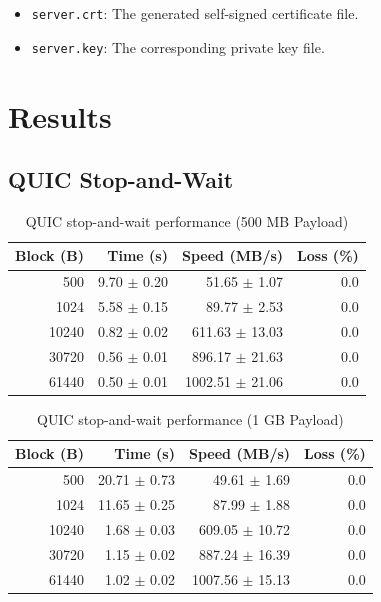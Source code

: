 \documentclass[12pt,a4paper]{article}
\begin{document}
\begin{itemize}
    \item \texttt{server.crt}: The generated self-signed certificate file.
    \item \texttt{server.key}: The corresponding private key file.
\end{itemize}

\section{Results}

\subsection{QUIC Stop-and-Wait}

\begin{table}[H]
    \centering
    \begin{tabular}{rrrr}
        \toprule
        \textbf{Block (B)} & \textbf{Time (s)} & \textbf{Speed (MB/s)} & \textbf{Loss (\%)} \\
        \midrule
        500 & 9.70 $\pm$ 0.20 & 51.65 $\pm$ 1.07 & 0.0 \\
        1024 & 5.58 $\pm$ 0.15 & 89.77 $\pm$ 2.53 & 0.0 \\
        10240 & 0.82 $\pm$ 0.02 & 611.63 $\pm$ 13.03 & 0.0 \\
        30720 & 0.56 $\pm$ 0.01 & 896.17 $\pm$ 21.63 & 0.0 \\
        61440 & 0.50 $\pm$ 0.01 & 1002.51 $\pm$ 21.06 & 0.0 \\
        \bottomrule
    \end{tabular}
    \caption{QUIC stop-and-wait performance (500 MB Payload)}
    \label{tab:quic_sw_500mb}
\end{table}

\begin{table}[H]
    \centering
    \begin{tabular}{rrrr}
        \toprule
        \textbf{Block (B)} & \textbf{Time (s)} & \textbf{Speed (MB/s)} & \textbf{Loss (\%)} \\
        \midrule
        500 & 20.71 $\pm$ 0.73 & 49.61 $\pm$ 1.69 & 0.0 \\
        1024 & 11.65 $\pm$ 0.25 & 87.99 $\pm$ 1.88 & 0.0 \\
        10240 & 1.68 $\pm$ 0.03 & 609.05 $\pm$ 10.72 & 0.0 \\
        30720 & 1.15 $\pm$ 0.02 & 887.24 $\pm$ 16.39 & 0.0 \\
        61440 & 1.02 $\pm$ 0.02 & 1007.56 $\pm$ 15.13 & 0.0 \\
        \bottomrule
    \end{tabular}
    \caption{QUIC stop-and-wait performance (1 GB Payload)}
    \label{tab:quic_sw_1gb}
\end{table}
\end{document}
